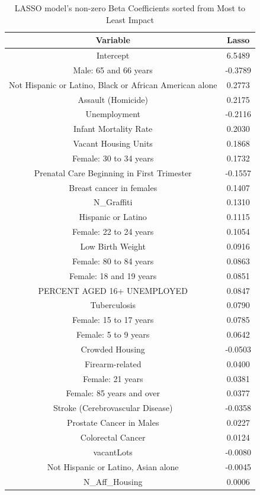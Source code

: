 \documentclass{article} %
\begin{document}
\begin{table}[h]
\centering
\begin{adjustbox}{width = 0.85\textwidth}
\begin{tabular}{cc}
  \hline
Variable & Lasso \\ 
  \hline
Intercept & 6.5489 \\ 
  Male: 65 and 66 years & -0.3789 \\ 
  Not Hispanic or Latino, Black or African American alone & 0.2773 \\ 
  Assault (Homicide) & 0.2175 \\ 
  Unemployment & -0.2116 \\ 
  Infant Mortality Rate & 0.2030 \\ 
  Vacant Housing Units & 0.1868 \\ 
  Female: 30 to 34 years & 0.1732 \\ 
  Prenatal Care Beginning in First Trimester & -0.1557 \\ 
  Breast cancer in females & 0.1407 \\ 
  N\_Graffiti & 0.1310 \\ 
  Hispanic or Latino & 0.1115 \\ 
  Female: 22 to 24 years & 0.1054 \\ 
  Low Birth Weight & 0.0916 \\ 
  Female: 80 to 84 years & 0.0863 \\ 
  Female: 18 and 19 years & 0.0851 \\ 
  PERCENT AGED 16+ UNEMPLOYED & 0.0847 \\ 
  Tuberculosis & 0.0790 \\ 
  Female: 15 to 17 years & 0.0785 \\ 
  Female: 5 to 9 years & 0.0642 \\ 
  Crowded Housing & -0.0503 \\ 
  Firearm-related & 0.0400 \\ 
  Female: 21 years & 0.0381 \\ 
  Female: 85 years and over & 0.0377 \\ 
  Stroke (Cerebrovascular Disease) & -0.0358 \\ 
  Prostate Cancer in Males & 0.0227 \\ 
  Colorectal Cancer & 0.0124 \\ 
  vacantLots & -0.0080 \\ 
  Not Hispanic or Latino, Asian alone & -0.0045 \\ 
  N\_Aff\_Housing & 0.0006 \\ 
   \hline
\end{tabular}
\end{adjustbox}
\caption{LASSO model's non-zero Beta Coefficients sorted from Most to Least Impact}
\label{table:lassoBetaNonZero}
\end{table}
\end{document}
